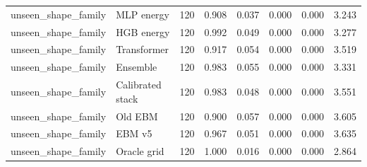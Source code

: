 {\begin{longtable}{llrrrrrr}
unseen\_shape\_family & MLP energy & 120 & 0.908 & 0.037 & 0.000 & 0.000 & 3.243 \\
unseen\_shape\_family & HGB energy & 120 & 0.992 & 0.049 & 0.000 & 0.000 & 3.277 \\
unseen\_shape\_family & Transformer & 120 & 0.917 & 0.054 & 0.000 & 0.000 & 3.519 \\
unseen\_shape\_family & Ensemble & 120 & 0.983 & 0.055 & 0.000 & 0.000 & 3.331 \\
unseen\_shape\_family & Calibrated stack & 120 & 0.983 & 0.048 & 0.000 & 0.000 & 3.551 \\
unseen\_shape\_family & Old EBM & 120 & 0.900 & 0.057 & 0.000 & 0.000 & 3.605 \\
unseen\_shape\_family & EBM v5 & 120 & 0.967 & 0.051 & 0.000 & 0.000 & 3.635 \\
unseen\_shape\_family & Oracle grid & 120 & 1.000 & 0.016 & 0.000 & 0.000 & 2.864 \\
\bottomrule
\end{longtable}
}
